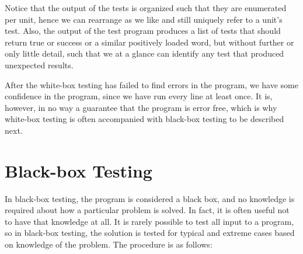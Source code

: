 Notice that the output of the tests is organized such that they are enumerated per unit, hence we can rearrange as we like and still uniquely refer to a unit's test. Also, the output of the test program produces a list of tests that should return true or success or a similar positively loaded word, but without further or only little detail, such that we at a glance can identify any test that produced unexpected results.

After the white-box testing has failed to find errors in the program, we have some confidence in the program, since we have run every line at least once. It is, however, in no way a guarantee that the program is error free, which is why white-box testing is often accompanied with black-box testing to be described next.

\section{Black-box Testing}
In black-box testing, the program is considered a black box, and no knowledge is required about how a particular problem is solved. In fact, it is often useful not to have that knowledge at all. It is rarely possible to test all input to a program, so in black-box testing, the solution is tested for typical and extreme cases based on knowledge of the problem. The procedure is as follows:
